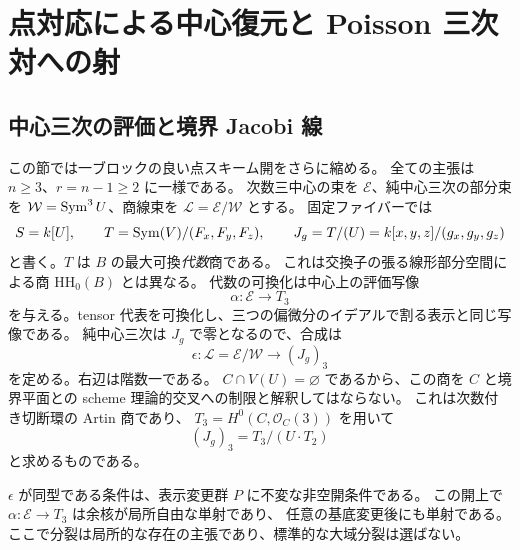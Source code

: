 \section{点対応による中心復元と Poisson 三次対への射}
\label{sec:poisson-morphism}

\subsection{中心三次の評価と境界 Jacobi 線}

この節では一ブロックの良い点スキーム開をさらに縮める。
全ての主張は $n\ge3$、$r=n-1\ge2$ に一様である。
次数三中心の束を $\mathcal E$、純中心三次の部分束を
$\mathcal W=\operatorname{Sym}^3U$、商線束を $\mathcal L=\mathcal E/\mathcal W$ とする。
固定ファイバーでは
\[
 S=k[U],\qquad T=\operatorname{Sym}(V)/(F_x,F_y,F_z),\qquad
 J_g=T/(U)=k[x,y,z]/(g_x,g_y,g_z)
\]
と書く。$T$ は $B$ の最大可換\emph{代数}商である。
これは交換子の張る線形部分空間による商 $\mathrm{HH}_0(B)$ とは異なる。
代数の可換化は中心上の評価写像
\[
 \alpha:\mathcal E\longrightarrow T_3
\]
を与える。tensor 代表を可換化し、三つの偏微分のイデアルで割る表示と同じ写像である。
純中心三次は $J_g$ で零となるので、合成は
\begin{equation}\label{eq:point-boundary-jacobi-map}
 \epsilon:\mathcal L=\mathcal E/\mathcal W\longrightarrow (J_g)_3
\end{equation}
を定める。右辺は階数一である。
$C\cap V(U)=\varnothing$ であるから、この商を $C$ と境界平面との
scheme 理論的交叉への制限と解釈してはならない。
これは次数付き切断環の Artin 商であり、
$T_3=H^0(C,\mathcal O_C(3))$ を用いて
\[
 (J_g)_3=T_3/(U\cdot T_2)
\]
と求めるものである。

\begin{proposition}\label{prop:point-jacobi-evaluation}
$\epsilon$ が同型である条件は、表示変更群 $P$ に不変な非空開条件である。
この開上で $\alpha:\mathcal E\to T_3$ は余核が局所自由な単射であり、
任意の基底変更後にも単射である。
ここで分裂は局所的な存在の主張であり、標準的な大域分裂は選ばない。
\end{proposition}


